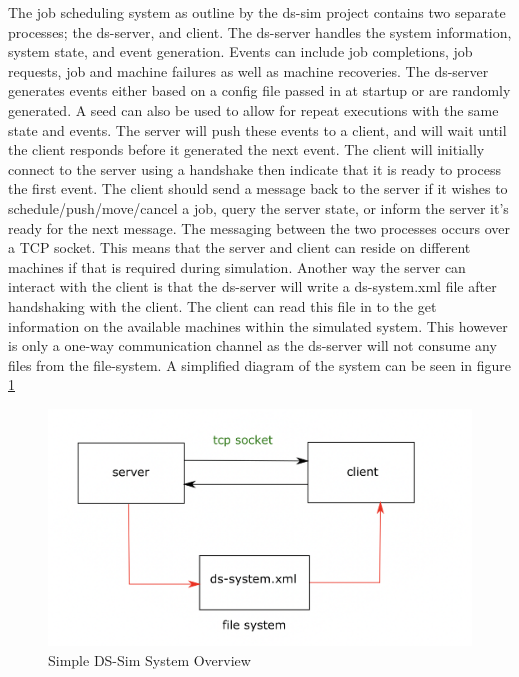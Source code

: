 \documentclass[a4paper]{article} %
\begin{document}
The job scheduling system as outline by the ds-sim project \cite{dssim} contains two separate processes; the ds-server, and client.
The ds-server handles the system information, system state, and event generation.
Events can include job completions, job requests, job and machine failures as well as machine recoveries.
The ds-server generates events either based on a config file passed in at startup or are randomly generated. A seed can also be used to allow for repeat executions with the same state and events. The server will push these events to a client, and will wait until the client responds before it generated the next event.
\newline
The client will initially connect to the server using a handshake then indicate that it is ready to process the first event.
The client should send a message back to the server if it wishes to schedule/push/move/cancel a job, query the server state, or inform the server it's ready for the next message.
The messaging between the two processes occurs over a TCP socket. This means that the server and client can reside on different machines if that is required during simulation.
Another way the server can interact with the client is that the ds-server will write a ds-system.xml file after handshaking with the client.
The client can read this file in to the get information on the available machines within the simulated system.
This however is only a one-way communication channel as the ds-server will not consume any files from the file-system.
A simplified diagram of the system can be seen in figure \ref{ds-sim_overview}
\begin{figure}[H]
    \centering
    \includegraphics[scale=0.5]{./ds-sim_architecture.png}
    \caption{Simple DS-Sim System Overview}
    \label{ds-sim_overview}
\end{figure}
\end{document}
